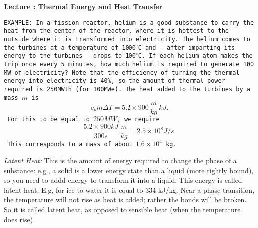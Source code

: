 \documentclass[11pt]{book}
\def\be{\begin{equation}}
\def\ee{\end{equation}}
\newcommand\example[1]{{\tt EXAMPLE: #1}}
\newcommand\lecture[1]{\newpage
\addtocounter{lectureno}{1}
\setcounter{secno}{0}
\begin{center}
 {\bf Lecture \arabic{lectureno}: #1}
\end{center}
}
\newcounter{lectureno}
\newcounter{secno}
\begin{document}
 
 
 
\lecture{Thermal Energy and Heat Transfer}

 \example{In a fission reactor, helium is a good substance to carry the heat from the center of the reactor, where it is hottest to the outside where it is transformed into electricity. The helium comes to the turbines at a temperature of 1000$^\circ$C and -- after imparting its energy to the turbines -- drops to 100$^\circ$C. If each helium atom makes the trip once every 5 minutes, how much helium is required to generate 100 MW of electricity? Note that the efficiency of turning the thermal energy into electricity is 40\%, so the amount of thermal power required is 250MWth (for 100MWe).
The heat added to the turbines by a mass $m$ is 
\be
c_p m\Delta T = 5.2\times 900\,\frac{m}{kg}\, kJ.\ee
For this to be equal to $250MW$, we require 
\be
\frac{5.2\times 900kJ}{300 s} \,\frac{m}{kg} = 2.5\times 10^8J/s.\ee
This corresponds to a mass of about $1.6\times 10^4$ kg.
}

 {\it Latent Heat:} This is the amount of energy required to change the phase of a substance: e.g., a solid is a lower energy state than a liquid (more tightly bound), so you need to addd energy to transform it into a liquid. This energy is called latent heat. E.g, for ice to water it is equal to 334 kJ/kg. %
Near a phase transition, the temperature will not rise as heat is added; rather the bonds will be broken. So it is called latent heat, as opposed to sensible heat (when the temperature does rise).
\end{document}
